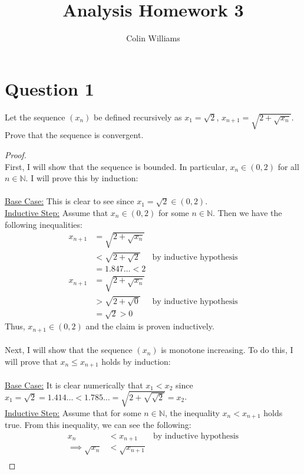\documentclass[10pt,a4paper]{article}
\title{Analysis Homework 3}
\author{Colin Williams}
\theoremstyle{definition}
\theoremstyle{definition}
\begin{document}
\maketitle

\section*{Question 1}
Let the sequence $(x_n)$ be defined recursively as $x_1 = \sqrt{2}$, $x_{n+1} = \sqrt{2 + \sqrt{x_n}}$. Prove that the sequence is convergent. 

\begin{proof}$ $
\\First, I will show that the sequence is bounded. In particular, $x_n \in (0, 2)$ for all $n \in \mathbb{N}$. I will prove this by induction:
\\
\\\underline{Base Case:} This is clear to see since $x_1 = \sqrt{2} \in (0, 2)$. 
\\\underline{Inductive Step:} Assume that $x_n \in (0, 2)$ for some $n \in \mathbb{N}$. Then we have the following inequalities:
\begin{align*}
x_{n+1} &= \sqrt{2 + \sqrt{x_n}}\\
&< \sqrt{2 + \sqrt{2}} &\text{by inductive hypothesis}\\
&= 1.847\ldots < 2\\
x_{n+1} &= \sqrt{2 + \sqrt{x_n}}\\
&> \sqrt{2 + \sqrt{0}} &\text{by inductive hypothesis}\\
&= \sqrt{2} > 0
\end{align*}
Thus, $x_{n+1} \in (0, 2)$ and the claim is proven inductively. 
\\
\\Next, I will show that the sequence $(x_n)$ is monotone increasing. To do this, I will prove that $x_n \leq x_{n+1}$ holds by induction:
\\
\\\underline{Base Case:} It is clear numerically that $x_1 < x_2$ since $x_1 = \sqrt{2} = 1.414\ldots < 1.785\ldots = \sqrt{2 + \sqrt{\sqrt{2}}} = x_2$.
\\\underline{Inductive Step:} Assume that for some $n \in \mathbb{N}$, the inequality $x_{n} < x_{n+1}$ holds true. From this inequality, we can see the following:
\begin{align*}
x_n &< x_{n+1} &\text{by inductive hypothesis}\\
\implies \sqrt{x_n} &< \sqrt{x_{n+1}}\\

\end{align*}
\end{proof}
\end{document}
